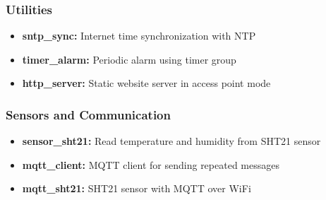 \subsubsection{Utilities}
\begin{itemize}
    \item \textbf{sntp\_sync:} Internet time synchronization with NTP
    \item \textbf{timer\_alarm:} Periodic alarm using timer group
    \item \textbf{http\_server:} Static website server in access point mode
\end{itemize}

\subsubsection{Sensors and Communication}
\begin{itemize}
    \item \textbf{sensor\_sht21:} Read temperature and humidity from SHT21 sensor
    \item \textbf{mqtt\_client:} MQTT client for sending repeated messages
    \item \textbf{mqtt\_sht21:} SHT21 sensor with MQTT over WiFi
\end{itemize}
